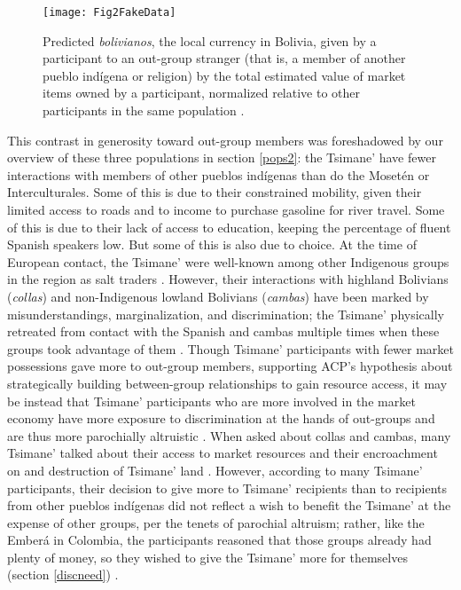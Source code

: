 \documentclass[bibauthoryear]{aa}
\begin{document}
 \begin{figure}[t]
	\centering
	\texttt{[image: Fig2FakeData]}
	\caption{{\footnotesize Predicted \textit{bolivianos}, the local currency in Bolivia, given by a participant to an out-group stranger (that is, a member of another pueblo ind\'igena or religion) by the total estimated value of market items owned by a participant, normalized relative to other participants in the same population \citep{pisor2016risk, pisor2018diversify}.}} \label{boliviamarket}
\end{figure}

This contrast in generosity toward out-group members was foreshadowed by our overview of these three populations in section \ref{pops2}: the Tsimane' have fewer interactions with members of other pueblos ind\'igenas than do the Moset\'en or Interculturales. Some of this is due to their constrained mobility, given their limited access to roads and to income to purchase gasoline for river travel. Some of this is due to their lack of access to education, keeping the percentage of fluent Spanish speakers low. But some of this is also due to choice. At the time of European contact, the Tsimane' were well-known among other Indigenous groups in the region as salt traders \citep{godoy2015natural,  ref947717999}. However, their interactions with highland Bolivians (\textit{collas}) and non-Indigenous lowland Bolivians (\textit{cambas}) have been marked by misunderstandings, marginalization, and discrimination; the Tsimane' physically retreated from contact with the Spanish and cambas multiple times when these groups took advantage of them \citep{godoy2015natural, ringhofer2010exploring, tomas2008tsimane}. Though Tsimane' participants with fewer market possessions gave more to out-group members, supporting ACP's hypothesis about strategically building between-group relationships to gain resource access, it may be instead that Tsimane' participants who are more involved in the market economy have more exposure to discrimination at the hands of out-groups and are thus more parochially altruistic \citep{pisor2018diversify}. When asked about collas and cambas, many Tsimane' talked about their access to market resources and their encroachment on and destruction of Tsimane' land \citep{pisor2018diversify}. However, according to many Tsimane' participants, their decision to give more to Tsimane' recipients than to recipients from other pueblos ind\'igenas did not reflect a wish to benefit the Tsimane' at the expense of other groups, per the tenets of parochial altruism; rather, like the Ember\'a in Colombia, the participants reasoned that those groups already had plenty of money, so they wished to give the Tsimane' more for themselves (section \ref{discneed}) \citep{Pisor2020}.
	
\end{document}
